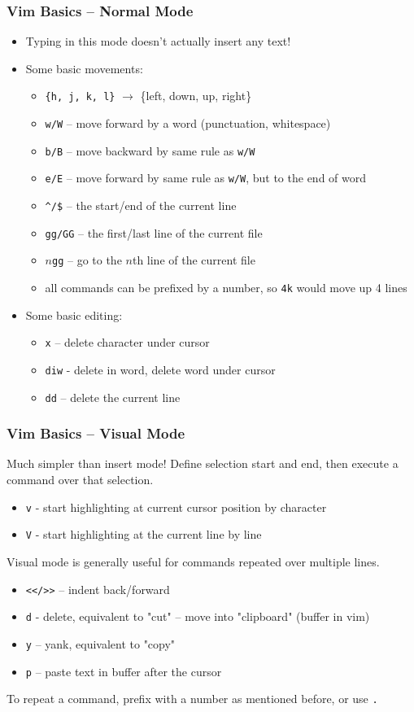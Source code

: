 \documentclass{beamer}
\begin{document}
\begin{frame}
  \frametitle{Vim Basics -- Normal Mode}
  \begin{itemize}
    \item Typing in this mode doesn't actually insert any text!
    \item Some basic movements:
      \begin{itemize}
        \item \texttt{\{h, j, k, l\}} $\rightarrow$ \{left, down, up, right\}
        \item \texttt{w/W} -- move forward by a word (punctuation, whitespace)
        \item \texttt{b/B} -- move backward by same rule as \texttt{w/W} 
        \item \texttt{e/E} -- move forward by same rule as \texttt{w/W}, but to the end of word
        \item \texttt{\^{}/\$} -- the start/end of the current line
        \item \texttt{gg/GG} -- the first/last line of the current file
        \item $n$\texttt{gg} -- go to the $n$th line of the current file
        \item all commands can be prefixed by a number, so \texttt{4k} would move up 4 lines
      \end{itemize}
    \item Some basic editing:
      \begin{itemize}
        \item \texttt{x} -- delete character under cursor
        \item \texttt{diw} - delete in word, delete word under cursor
        \item \texttt{dd} -- delete the current line
      \end{itemize}
  \end{itemize}
\end{frame}

\begin{frame}
  \frametitle{Vim Basics -- Visual Mode}
  Much simpler than insert mode! Define selection start and end, then execute a command over that selection.
  \begin{itemize}
    \item \texttt{v} - start highlighting at current cursor position by character
    \item \texttt{V} - start highlighting at the current line by line
  \end{itemize}
  Visual mode is generally useful for commands repeated over multiple lines.
  \begin{itemize}
    \item \texttt{<</>>} -- indent back/forward
    \item \texttt{d} - delete,  equivalent to "cut" -- move into "clipboard" (buffer in vim)
    \item \texttt{y} -- yank, equivalent to "copy"
    \item \texttt{p} -- paste text in buffer after the cursor
  \end{itemize}
  To repeat a command, prefix with a number as mentioned before, or use \texttt{.}
\end{frame}
\end{document}
